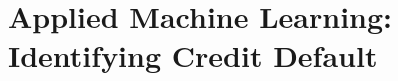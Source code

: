 \chapter{Applied Machine Learning: Identifying Credit Default\label{Applied Machine Learning: Identifying Credit Default}}